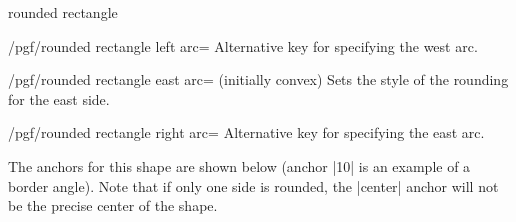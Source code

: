 \begin{shape}{rounded rectangle}
\begin{stylekey}{/pgf/rounded rectangle left arc=}
	Alternative key for specifying the west arc.
\end{stylekey}

\begin{key}{/pgf/rounded rectangle east arc= (initially convex)}
	Sets the style of the rounding for the east side.
\end{key}

\begin{stylekey}{/pgf/rounded rectangle right arc=}
	Alternative key for specifying the east arc.
\end{stylekey}

	The anchors for this shape are shown below (anchor |10| is an example
	of a border angle). Note that if only one side is rounded, the
	|center| anchor will not be the precise center of the shape.
	
\begin{codeexample}[]
\Huge
{}
\end{codeexample}

\end{shape}


